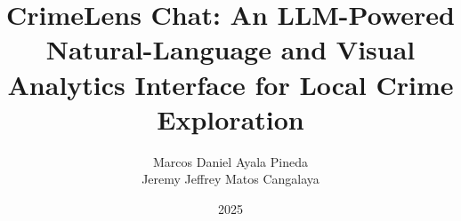 \documentclass[a4paper,12pt,oneside]{tesisutec}
\begin{document}
\frontmatter



\title{CrimeLens Chat: An LLM-Powered Natural-Language and Visual Analytics Interface for Local Crime Exploration}




\author{Marcos Daniel Ayala Pineda \\ Jeremy Jeffrey Matos Cangalaya} %

\date{2025}
\maketitle



%
%

\tableofcontents




\mainmatter
\pagestyle{fancy}

% 
%  




% 
% 


\renewcommand{\bibname}{\hfill\Large\bf{BIBLIOGRAPHY}\hfill}



% 
\end{document}
